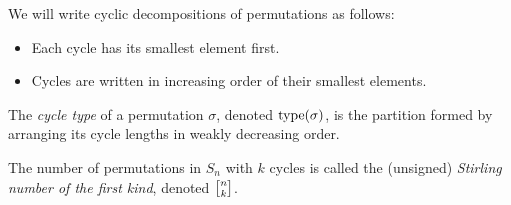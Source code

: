 \begin{notation}
    We will write cyclic decompositions of permutations as follows:
    \begin{itemize}
        \item Each cycle has its smallest element first.
        \item Cycles are written in increasing order of their smallest
            elements.
    \end{itemize}
\end{notation}

\begin{definition}
    The \emph{cycle type} of a permutation $\sigma$, denoted
    $\operatorname{type}(\sigma)$, is the partition formed by arranging its cycle lengths
    in weakly decreasing order.
\end{definition}

\begin{definition}
    The number of permutations in $S_n$ with $k$ cycles is called the
    (unsigned) \emph{Stirling number of the first kind}, denoted
    $\ftirling nk$.
\end{definition}
